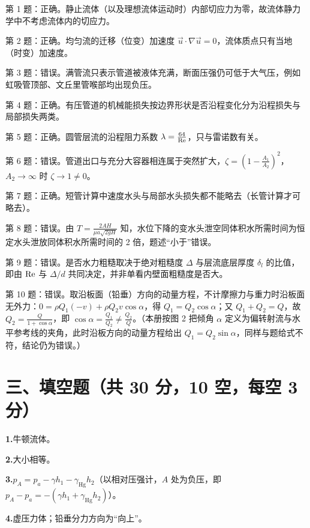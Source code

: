 \begin{tishi}
第 1 题：正确。静止流体（以及理想流体运动时）内部切应力为零，故流体静力学中不考虑流体内的切应力。

第 2 题：正确。均匀流的迁移（位变）加速度 $\vec u\cdot\nabla\vec u=0$，流体质点只有当地（时变）加速度。

第 3 题：错误。满管流只表示管道被液体充满，断面压强仍可低于大气压，例如虹吸管顶部、文丘里管喉部均出现负压。

第 4 题：正确。有压管道的机械能损失按边界形状是否沿程变化分为沿程损失与局部损失两类。

第 5 题：正确。圆管层流的沿程阻力系数 $\lambda=\frac{64}{\mathrm{Re}}$，只与雷诺数有关。

第 6 题：错误。管道出口与充分大容器相连属于突然扩大，$\zeta=\left(1-\frac{A_1}{A_2}\right)^{2}$，$A_2\to\infty$ 时 $\zeta\to 1\neq 0$。

第 7 题：正确。短管计算中速度水头与局部水头损失都不能略去（长管计算才可略去）。

第 8 题：错误。由 $T=\frac{2AH}{\mu a\sqrt{2gH}}$ 知，水位下降的变水头泄空同体积水所需时间为恒定水头泄放同体积水所需时间的 2 倍，题述“小于”错误。

第 9 题：错误。是否水力粗糙取决于绝对粗糙度 $\Delta$ 与层流底层厚度 $\delta_l$ 的比值，即由 $\mathrm{Re}$ 与 $\Delta/d$ 共同决定，并非单看内壁面粗糙度是否大。

第 10 题：错误。取沿板面（铅垂）方向的动量方程，不计摩擦力与重力时沿板面无外力：$0=\rho Q_1(-v)+\rho Q_2v\cos\alpha$，得 $Q_1=Q_2\cos\alpha$；又 $Q_1+Q_2=Q$，故 $Q_2=\frac{Q}{1+\cos\alpha}$，即 $\cos\alpha=\frac{Q_1}{Q_2}\neq\frac{Q_2}{Q}$。（本册按图 2 把倾角 $\alpha$ 定义为偏转射流与水平参考线的夹角，此时沿板方向的动量方程给出 $Q_1=Q_2\sin\alpha$，同样与题给式不符，结论仍为错误。）
\end{tishi}

\section{三、填空题（共 30 分，10 空，每空 3 分）}


\noindent\textbf{1.}\quad 牛顿流体。

\noindent\textbf{2.}\quad 大小相等。

\noindent\textbf{3.}\quad $p_A=p_a-\gamma h_1-\gamma_{\mathrm{Hg}}h_2$（以相对压强计，$A$ 处为负压，即 $p_A-p_a=-\left(\gamma h_1+\gamma_{\mathrm{Hg}}h_2\right)$）。

\noindent\textbf{4.}\quad 虚压力体；铅垂分力方向为“向上”。


